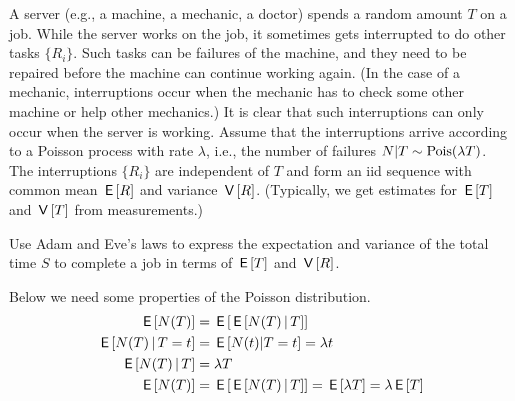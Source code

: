 \begin{exercise}
A server (e.g., a machine, a mechanic, a doctor) spends a random amount $T$ on a job.
While the server works on the job, it sometimes gets interrupted to do other tasks $\{R_{i}\}$.
Such tasks can be failures of the machine, and they need to be repaired before the machine can continue working again.
(In the case of a mechanic, interruptions occur when the mechanic has to check some other machine or help other mechanics.)
It is clear that such interruptions can only occur when the server is working.
Assume that the interruptions arrive according to a Poisson process with rate $\lambda$, i.e., the number of failures $N| T \sim\mathrm{Pois}(\lambda T)$.
The interruptions $\{R_{i}\}$ are independent of $T$ and form an iid sequence with common mean $\,\mathsf{E}\left[R\right]$ and variance $\,\mathsf{V}\left[R\right]$.
(Typically, we get estimates for $\,\mathsf{E}\left[T\right]$ and $\,\mathsf{V}\left[T\right]$ from measurements.)

Use Adam and Eve's laws to express the expectation and variance of the total time $S$ to complete a job in terms of $\,\mathsf{E}\left[T\right]$ and $\,\mathsf{V}\left[R\right]$.
\begin{solution}

Below we need some properties of the Poisson distribution.
\begin{align}
\,\mathsf{E}\left[N(T)\right] &= \,\mathsf{E}\left[\,\mathsf{E}\left[N(T)\,\middle|\, T\right]\right]\\
\,\mathsf{E}\left[N(T)\,\middle|\, T=t\right]&= \,\mathsf{E}\left[N(t)|T=t\right] = \lambda t \\
\,\mathsf{E}\left[N(T)\,\middle|\, T\right]&= \lambda T \\
\,\mathsf{E}\left[N(T)\right] &= \,\mathsf{E}\left[\,\mathsf{E}\left[N(T)\,\middle|\, T\right]\right] = \,\mathsf{E}\left[\lambda T\right] = \lambda \,\mathsf{E}\left[T\right]\\
\end{align}


\end{solution}
\end{exercise}
